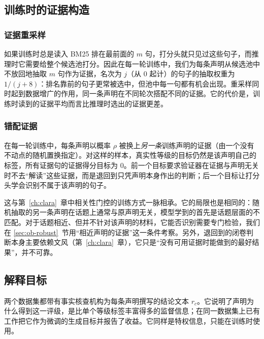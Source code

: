 \subsection{训练时的证据构造}\label{sec:ob-train}

\subsubsection{证据重采样}
如果训练时总是读入 BM25 排在最前面的 $m$ 句，打分头就只见过这些句子，而推理时它需要给整个候选池打分。因此在每一轮训练中，我们为每条声明从候选池中不放回地抽取 $m$ 句作为证据，名次为 $j$（从 0 起计）的句子的抽取权重为 $1/(j+8)$：排名靠前的句子更常被选中，但池中每一句都有机会出现。重采样同时起到数据增广的作用，同一条声明在不同轮次搭配不同的证据。它的代价是，训练时读到的证据平均而言比推理时选出的证据更差。

\subsubsection{错配证据}
在每一轮训练中，每条声明以概率 $\rho$ 被换上\emph{另一条}训练声明的证据（由一个没有不动点的随机置换指定）。对这样的样本，真实性等级的目标仍然是该声明自己的标签，所有证据句的证据得分目标为 $0$。前一个目标要求验证器在证据与声明无关时不去“解读”这些证据，而是退回到只凭声明本身作出的判断；后一个目标让打分头学会识别不属于该声明的句子。

这与第~\ref{ch:clara}~章中相关性门控的训练方式一脉相承。它的局限也是相同的：随机抽取的另一条声明在话题上通常与原声明无关，模型学到的首先是话题层面的不匹配。对于话题相近、但并不针对该声明的材料，它能否识别需要专门检验，我们在 \ref{sec:ob-robust}~节用“相近声明的证据”这一条件考察。另外，退回到的闭卷判断本身主要依赖文风（第~\ref{ch:clara}~章），它只是“没有可用证据时能做到的最好结果”，并不可靠。

\subsection{解释目标}\label{sec:ob-explain}

两个数据集都带有事实核查机构为每条声明撰写的结论文本 $r_c$。它说明了声明为什么得到这一评级，是比单个等级标签丰富得多的监督信息；在同一数据集上已有工作把它作为微调的生成目标并报告了收益\citep{kong2026reflex,wang2025eexpfnd}。它同样是特权信息，只能在训练时使用。

